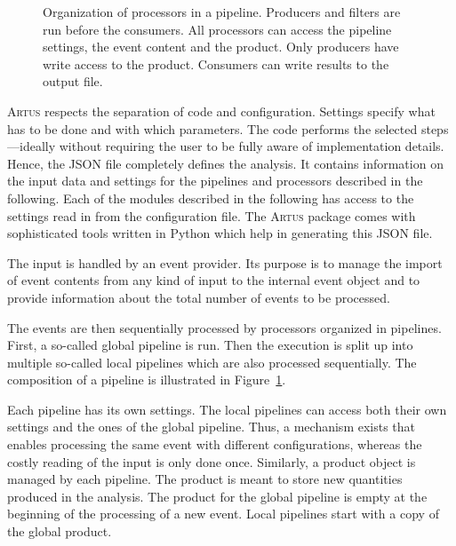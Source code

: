 \documentclass[3p]{elsarticle}
\newcommand{\software}[1]{\textsc{#1}\xspace}
\newcommand{\artus}{\software{Artus}}
\begin{document}
\begin{figure}[p]
\centering 
\caption[Structure of an \artus analysis.]{Structure of an \artus analysis.
The input is read by an event provider.
Within the pipelines the event content is analyzed by the processors.
Consumers in local pipelines write results to a common output.
All parts of the analysis are configurable.}
\label{figure_artus_structure}

\vspace{10ex}

\centering 
\caption[Organization of processors in a pipeline.]{Organization of processors in a pipeline.
Producers and filters are run before the consumers.
All processors can access the pipeline settings, the event content and the product.
Only producers have write access to the product.
Consumers can write results to the output file.}
\label{figure_artus_pipeline}
\end{figure}

\artus respects the separation of code and configuration.
Settings specify what has to be done and with which parameters.
The code performs the selected steps---ideally without requiring the user to be fully aware of implementation details.
Hence, the JSON file completely defines the analysis.
It contains information on the input data and settings for the pipelines and processors described in the following.
Each of the modules described in the following has access to the settings read in from the configuration file.
The \artus package comes with sophisticated tools written in Python which help in generating this JSON file.

The input is handled by an event provider.
Its purpose is to manage the import of event contents from any kind of input to the internal event object and to provide information about the total number of events to be processed.

The events are then sequentially processed by processors organized in pipelines.
First, a so-called global pipeline is run.
Then the execution is split up into multiple so-called local pipelines which are also processed sequentially.
The composition of a pipeline is illustrated in Figure~\ref{figure_artus_pipeline}.

Each pipeline has its own settings.
The local pipelines can access both their own settings and the ones of the global pipeline.
Thus, a mechanism exists that enables processing the same event with different configurations, whereas the costly reading of the input is only done once.
Similarly, a product object is managed by each pipeline.
The product is meant to store new quantities produced in the analysis.
The product for the global pipeline is empty at the beginning of the processing of a new event.
Local pipelines start with a copy of the global product.
\end{document}
